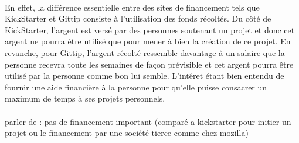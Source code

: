 \paragraph{}
En effet, la différence essentielle entre des sites de financement tels que KickStarter et Gittip consiste à l'utilisation des fonds récoltés. Du côté de KickStarter, l'argent est versé par des personnes soutenant un projet et donc cet argent ne pourra être utilisé que pour mener à bien la création de ce projet. En revanche, pour Gittip, l'argent récolté ressemble davantage à un salaire que la personne recevra toute les semaines de façon prévisible et cet argent pourra être utilisé par la personne comme bon lui semble. L'intêret étant bien entendu de fournir une aide financière à la personne pour qu'elle puisse consacrer un maximum de temps à ses projets personnels.

\paragraph{}
parler de : pas de financement important (comparé a kickstarter pour initier un projet ou
 le financement par une société tierce comme chez mozilla)


